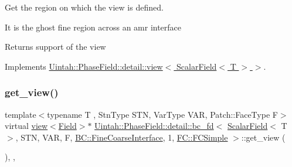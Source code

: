 Get the region on which the view is defined. 

It is the ghost fine region across an amr interface

\begin{DoxyReturn}{Returns}
support of the view 
\end{DoxyReturn}


Implements \hyperlink{classUintah_1_1PhaseField_1_1detail_1_1view_3_01ScalarField_3_01T_01_4_01_4_a3e14b0c7a57a57707bb33954861ab1c1}{Uintah\+::\+Phase\+Field\+::detail\+::view$<$ Scalar\+Field$<$ T $>$ $>$}.

\mbox{\label{classUintah_1_1PhaseField_1_1detail_1_1bc__fd_3_01ScalarField_3_01T_01_4_00_01STN_00_01VAR_00_01ce55d0bf8381798bc129da931b626e80_a579bb0bf5063314ac57aace2d8ff2c31}} 
\subsubsection{\texorpdfstring{get\+\_\+view()}{get\_view()}\hspace{0.1cm}{\footnotesize\ttfamily [1/2]}}
{\footnotesize\ttfamily template$<$typename T , Stn\+Type S\+TN, Var\+Type V\+AR, Patch\+::\+Face\+Type F$>$ \\
virtual \hyperlink{classUintah_1_1PhaseField_1_1detail_1_1view}{view}$<$\hyperlink{structUintah_1_1PhaseField_1_1ScalarField}{Field}$>$$\ast$ \hyperlink{classUintah_1_1PhaseField_1_1detail_1_1bc__fd}{Uintah\+::\+Phase\+Field\+::detail\+::bc\+\_\+fd}$<$ \hyperlink{structUintah_1_1PhaseField_1_1ScalarField}{Scalar\+Field}$<$ T $>$, S\+TN, V\+AR, F, \hyperlink{namespaceUintah_1_1PhaseField_a148fba372aa3be96fd6eede7a2fa10b5ad2d89be9637ff8b537fa4b6026c0e574}{B\+C\+::\+Fine\+Coarse\+Interface}, 1, \hyperlink{namespaceUintah_1_1PhaseField_aeb51fe956fe07f1487f5878f4039f27ca6a316dd1139b99e2a8af86106b3cf045}{F\+C\+::\+F\+C\+Simple} $>$\+::get\+\_\+view (\begin{DoxyParamCaption}{ }\end{DoxyParamCaption})\hspace{0.3cm}{\ttfamily [inline]}, {\ttfamily [override]}, {\ttfamily [virtual]}}



